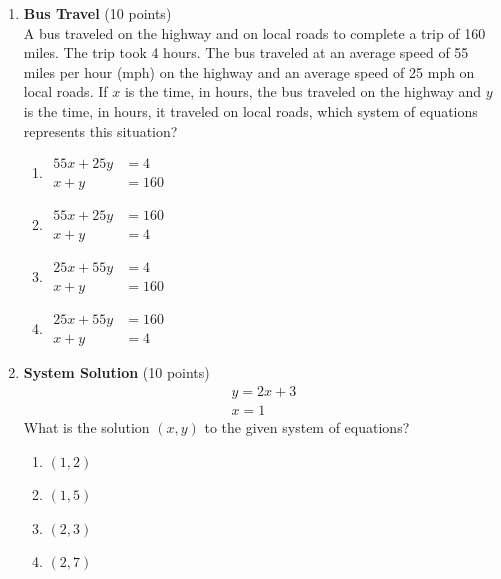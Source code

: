 \begin{enumerate}
  \item \textbf{Bus Travel} (10 points)\\
  A bus traveled on the highway and on local roads to complete a trip of 160 miles. The trip took 4 hours. The bus traveled at an average speed of 55 miles per hour (mph) on the highway and an average speed of 25 mph on local roads. If $x$ is the time, in hours, the bus traveled on the highway and $y$ is the time, in hours, it traveled on local roads, which system of equations represents this situation?\\
  \begin{enumerate}[label=(\Alph*)]
    \item $\begin{aligned} 55x+25y&=4 \\ x+y&=160 \end{aligned}$
    \item $\begin{aligned} 55x+25y&=160 \\ x+y&=4 \end{aligned}$
    \item $\begin{aligned} 25x+55y&=4 \\ x+y&=160 \end{aligned}$
    \item $\begin{aligned} 25x+55y&=160 \\ x+y&=4 \end{aligned}$
  \end{enumerate}
  \begin{subanswer}
  \end{subanswer}

  \item \textbf{System Solution} (10 points)\\
  \[\begin{gathered}
  y=2x+3 \\
  x=1
  \end{gathered}\]
  What is the solution $(x,y)$ to the given system of equations?\\
  \begin{enumerate}[label=(\Alph*)]
    \item $(1,2)$
    \item $(1,5)$
    \item $(2,3)$
    \item $(2,7)$
  \end{enumerate}
  \begin{subanswer}
  \end{subanswer}


\end{enumerate}
